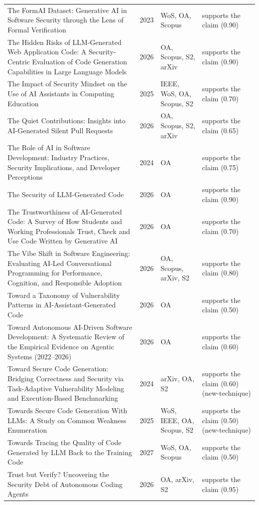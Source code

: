 \begin{longtable}{@{}%
  >{\raggedright\arraybackslash}p{}c%
  >{\raggedright\arraybackslash}p{}%
  >{\raggedright\arraybackslash}p{}@{}}
The FormAI Dataset: Generative AI in Software Security through the Lens of Formal Verification & 2023 & WoS, OA, Scopus & supports the claim (0.90) \\
The Hidden Risks of LLM-Generated Web Application Code: A Security-Centric Evaluation of Code Generation Capabilities in Large Language Models & 2026 & OA, Scopus, S2, arXiv & supports the claim (0.90) \\
The Impact of Security Mindset on the Use of AI Assistants in Computing Education & 2025 & IEEE, WoS, OA, Scopus, S2 & supports the claim (0.70) \\
The Quiet Contributions: Insights into AI-Generated Silent Pull Requests & 2026 & OA, Scopus, S2, arXiv & supports the claim (0.65) \\
The Role of AI in Software Development: Industry Practices, Security Implications, and Developer Perceptions & 2024 & OA & supports the claim (0.75) \\
The Security of LLM-Generated Code & 2026 & OA & supports the claim (0.90) \\
The Trustworthiness of AI-Generated Code: A Survey of How Students and Working Professionals Trust, Check and Use Code Written by Generative AI & 2026 & OA & supports the claim (0.70) \\
The Vibe Shift in Software Engineering: Evaluating AI-Led Conversational Programming for Performance, Cognition, and Responsible Adoption & 2026 & OA, Scopus, arXiv, S2 & supports the claim (0.80) \\
Toward a Taxonomy of Vulnerability Patterns in AI-Assistant-Generated Code & 2026 & OA & supports the claim (0.50) \\
Toward Autonomous AI-Driven Software Development: A Systematic Review of the Empirical Evidence on Agentic Systems (2022--2026) & 2026 & OA & supports the claim (0.60) \\
Toward Secure Code Generation: Bridging Correctness and Security via Task-Adaptive Vulnerability Modeling and Execution-Based Benchmarking & 2024 & arXiv, OA, S2 & supports the claim (0.60) (new-technique) \\
Towards Secure Code Generation With LLMs: A Study on Common Weakness Enumeration & 2025 & WoS, IEEE, OA, Scopus, S2 & supports the claim (0.50) (new-technique) \\
Towards Tracing the Quality of Code Generated by LLM Back to the Training Code & 2027 & WoS, OA, Scopus & supports the claim (0.50) \\
Trust but Verify? Uncovering the Security Debt of Autonomous Coding Agents & 2026 & OA, arXiv, S2 & supports the claim (0.95) \\

\end{longtable}
